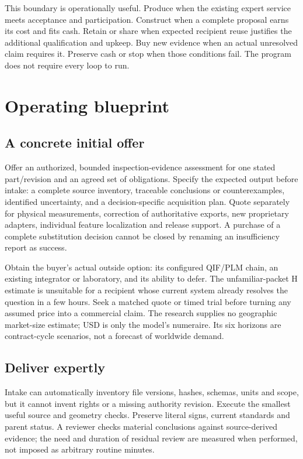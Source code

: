 \documentclass[
  11pt,
]{article}
\let\OriginalSection\section
\renewcommand{\section}{\needspace{5\baselineskip}\OriginalSection}
\let\OriginalSubsection\subsection
\renewcommand{\subsection}{\needspace{6\baselineskip}\OriginalSubsection}
\begin{document}
This boundary is operationally useful. Produce when the existing expert
service meets acceptance and participation. Construct when a complete
proposal earns its cost and fits cash. Retain or share when expected
recipient reuse justifies the additional qualification and upkeep. Buy
new evidence when an actual unresolved claim requires it. Preserve cash
or stop when those conditions fail. The program does not require every
loop to run.

\hypertarget{operating-blueprint}{%
\section{Operating blueprint}\label{operating-blueprint}}

\hypertarget{a-concrete-initial-offer}{%
\subsection{A concrete initial offer}\label{a-concrete-initial-offer}}

Offer an authorized, bounded inspection-evidence assessment for one
stated part/revision and an agreed set of obligations. Specify the
expected output before intake: a complete source inventory, traceable
conclusions or counterexamples, identified uncertainty, and a
decision-specific acquisition plan. Quote separately for physical
measurements, correction of authoritative exports, new proprietary
adapters, individual feature localization and release support. A
purchase of a complete substitution decision cannot be closed by
renaming an insufficiency report as success.

Obtain the buyer's actual outside option: its configured QIF/PLM chain,
an existing integrator or laboratory, and its ability to defer. The
unfamiliar-packet H estimate is unsuitable for a recipient whose current
system already resolves the question in a few hours. Seek a matched
quote or timed trial before turning any assumed price into a commercial
claim. The research supplies no geographic market-size estimate; USD is
only the model's numeraire. Its six horizons are contract-cycle
scenarios, not a forecast of worldwide demand.

\hypertarget{deliver-expertly}{%
\subsection{Deliver expertly}\label{deliver-expertly}}

Intake can automatically inventory file versions, hashes, schemas, units
and scope, but it cannot invent rights or a missing authority revision.
Execute the smallest useful source and geometry checks. Preserve literal
signs, current standards and parent status. A reviewer checks material
conclusions against source-derived evidence; the need and duration of
residual review are measured when performed, not imposed as arbitrary
routine minutes.
\end{document}
